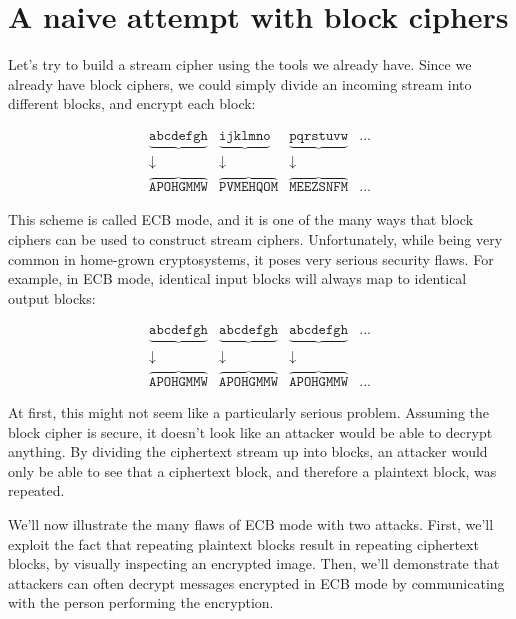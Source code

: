 \documentclass[11pt,ebook,table,dvipsnames]{memoir}
\begin{document}
\section{A naive attempt with block ciphers\label{ECB-mode}}
\label{sec-2-3-2}

Let's try to build a stream cipher using the tools we already have.
Since we already have block ciphers, we could simply divide an
incoming stream into different blocks, and encrypt each block:

\begin{equation}
\begin{matrix}
\underbrace{\mathtt{abcdefgh}} & \underbrace{\mathtt{ijklmno}} & \underbrace{\mathtt{pqrstuvw}} & ...\\
\downarrow & \downarrow & \downarrow & \\
\overbrace{\mathtt{APOHGMMW}} & \overbrace{\mathtt{PVMEHQOM}} & \overbrace{\mathtt{MEEZSNFM}} & ...
\end{matrix}
\end{equation}

This scheme is called \gls{ECB mode}, and it is one of the many ways
that block ciphers can be used to construct stream ciphers.
Unfortunately, while being very common in home-grown cryptosystems, it
poses very serious security flaws. For example, in ECB mode, identical
input blocks will always map to identical output blocks:

\begin{equation}
\begin{matrix}
\underbrace{\mathtt{abcdefgh}} & \underbrace{\mathtt{abcdefgh}} & \underbrace{\mathtt{abcdefgh}} & ...\\
\downarrow & \downarrow & \downarrow & \\
\overbrace{\mathtt{APOHGMMW}} & \overbrace{\mathtt{APOHGMMW}} & \overbrace{\mathtt{APOHGMMW}} & ...
\end{matrix}
\end{equation}

At first, this might not seem like a particularly serious problem.
Assuming the block cipher is secure, it doesn't look like an attacker
would be able to decrypt anything. By dividing the ciphertext stream
up into blocks, an attacker would only be able to see that a
ciphertext block, and therefore a plaintext block, was repeated.

We'll now illustrate the many flaws of ECB mode with two attacks.
First, we'll exploit the fact that repeating plaintext blocks result
in repeating ciphertext blocks, by visually inspecting an encrypted
image. Then, we'll demonstrate that attackers can often decrypt
messages encrypted in ECB mode by communicating with the person
performing the encryption.
\end{document}
